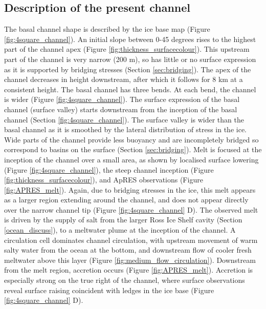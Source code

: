 \subsection{Description of the present channel}
The basal channel shape is described by the ice base map (Figure \ref{fig:4square_channel}). An initial slope between 0-45 degrees rises to the highest part of the channel apex (Figure \ref{fig:thickness_surfacecolour}). This upstream part of the channel is very narrow (200 m), so has little or no surface expression as it is supported by bridging stresses (Section \ref{sec:bridging}). The apex of the channel decreases in height downstream, after which it follows for 8 km at a consistent height.
The basal channel has three bends. At each bend, the channel is wider (Figure \ref{fig:4square_channel}).
The surface expression of the basal channel (surface valley) starts downstream from the inception of the basal channel (Section \ref{fig:4square_channel}). The surface valley is wider than the basal channel as it is smoothed by the lateral distribution of stress in the ice. Wide parts of the channel provide less buoyancy and are incompletely bridged so correspond to basins on the surface (Section \ref{sec:bridging}).
Melt is focused at the inception of the channel over a small area, as shown by localised surface lowering (Figure \ref{fig:4square_channel}), the steep channel inception (Figure \ref{fig:thickness_surfacecolour}), and ApRES observations (Figure \ref{fig:APRES_melt}). Again, due to bridging stresses in the ice, this melt appears as a larger region extending around the channel, and does not appear directly over the narrow channel tip  (Figure \ref{fig:4square_channel} D). 
The observed melt is driven by the supply of salt from the larger Ross Ice Shelf cavity (Section \ref{ocean_discuss}), to a meltwater plume at the inception of the channel. A circulation cell dominates channel circulation, with upstream movement of warm salty water from the ocean at the bottom, and downstream flow of cooler fresh meltwater above this layer (Figure \ref{fig:medium_flow_circulation}). 
Downstream from the melt region, accretion occurs (Figure \ref{fig:APRES_melt}).
Accretion is especially strong on the true right of the channel, where surface observations reveal surface raising coincident with ledges in the ice base (Figure \ref{fig:4square_channel} D). 

